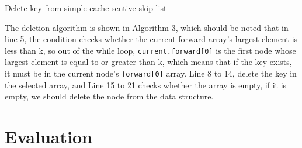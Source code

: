 \documentclass[sigconf, nonacm, letterpaper,top=2cm,bottom=2cm,left=3cm,right=3cm,marginparwidth=1.75cm]{acmart}
\begin{document}
\begin{algorithm}
        \caption{Delete key from simple cache-sentive skip list}
\end{algorithm}
    



The deletion algorithm is shown in Algorithm 3, which should be noted that in line 5,  the condition checks whether the current forward array's largest element is less than k, so out of the while loop,  \texttt{current.forward[0]} is the first node whose largest element is equal to or greater than k, which means that if the key exists, it must be in the current node’s \texttt{forward[0]} array. Line 8 to 14, delete the key in the selected array, and Line 15 to 21 checks whether the array is empty, if it is empty, we should delete the node from the data structure.


\section{Evaluation}
\end{document}
